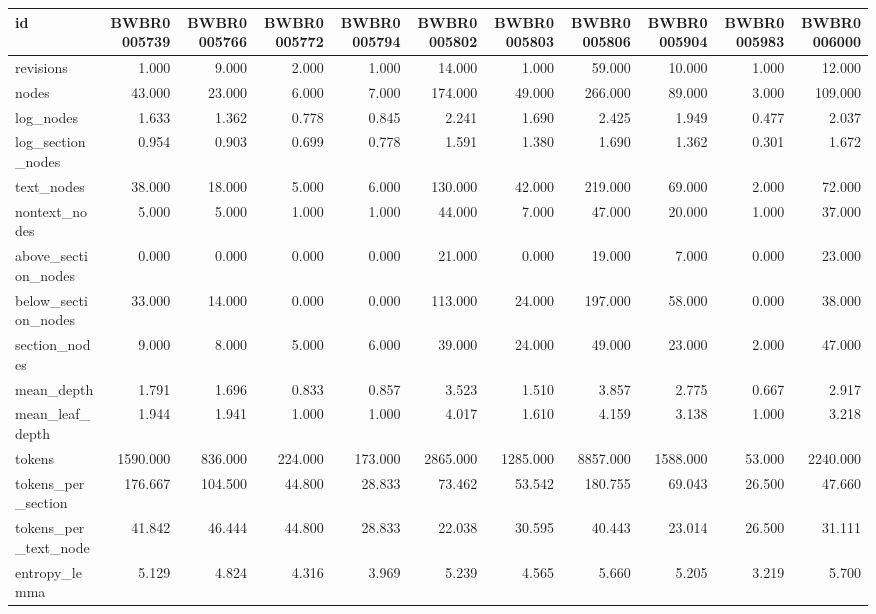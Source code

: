 \begin{tabular}{lrrrrrrrrrr}
\toprule
id & BWBR0005739 & BWBR0005766 & BWBR0005772 & BWBR0005794 & BWBR0005802 & BWBR0005803 & BWBR0005806 & BWBR0005904 & BWBR0005983 & BWBR0006000 \\
\midrule
revisions & 1.000 & 9.000 & 2.000 & 1.000 & 14.000 & 1.000 & 59.000 & 10.000 & 1.000 & 12.000 \\
\cline{1-11}
nodes & 43.000 & 23.000 & 6.000 & 7.000 & 174.000 & 49.000 & 266.000 & 89.000 & 3.000 & 109.000 \\
\cline{1-11}
log\_nodes & 1.633 & 1.362 & 0.778 & 0.845 & 2.241 & 1.690 & 2.425 & 1.949 & 0.477 & 2.037 \\
\cline{1-11}
log\_section\_nodes & 0.954 & 0.903 & 0.699 & 0.778 & 1.591 & 1.380 & 1.690 & 1.362 & 0.301 & 1.672 \\
\cline{1-11}
text\_nodes & 38.000 & 18.000 & 5.000 & 6.000 & 130.000 & 42.000 & 219.000 & 69.000 & 2.000 & 72.000 \\
\cline{1-11}
nontext\_nodes & 5.000 & 5.000 & 1.000 & 1.000 & 44.000 & 7.000 & 47.000 & 20.000 & 1.000 & 37.000 \\
\cline{1-11}
above\_section\_nodes & 0.000 & 0.000 & 0.000 & 0.000 & 21.000 & 0.000 & 19.000 & 7.000 & 0.000 & 23.000 \\
\cline{1-11}
below\_section\_nodes & 33.000 & 14.000 & 0.000 & 0.000 & 113.000 & 24.000 & 197.000 & 58.000 & 0.000 & 38.000 \\
\cline{1-11}
section\_nodes & 9.000 & 8.000 & 5.000 & 6.000 & 39.000 & 24.000 & 49.000 & 23.000 & 2.000 & 47.000 \\
\cline{1-11}
mean\_depth & 1.791 & 1.696 & 0.833 & 0.857 & 3.523 & 1.510 & 3.857 & 2.775 & 0.667 & 2.917 \\
\cline{1-11}
mean\_leaf\_depth & 1.944 & 1.941 & 1.000 & 1.000 & 4.017 & 1.610 & 4.159 & 3.138 & 1.000 & 3.218 \\
\cline{1-11}
tokens & 1590.000 & 836.000 & 224.000 & 173.000 & 2865.000 & 1285.000 & 8857.000 & 1588.000 & 53.000 & 2240.000 \\
\cline{1-11}
tokens\_per\_section & 176.667 & 104.500 & 44.800 & 28.833 & 73.462 & 53.542 & 180.755 & 69.043 & 26.500 & 47.660 \\
\cline{1-11}
tokens\_per\_text\_node & 41.842 & 46.444 & 44.800 & 28.833 & 22.038 & 30.595 & 40.443 & 23.014 & 26.500 & 31.111 \\
\cline{1-11}
entropy\_lemma & 5.129 & 4.824 & 4.316 & 3.969 & 5.239 & 4.565 & 5.660 & 5.205 & 3.219 & 5.700 \\

\end{tabular}
